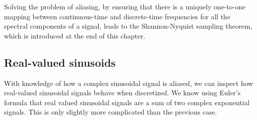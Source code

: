 Solving the problem of aliasing, by ensuring that there is a uniquely one-to-one mapping 
between continuous-time and discrete-time frequencies for all the spectral components 
of a signal, leads to the Shannon-Nyquist sampling theorem, which is introduced at the end of this chapter.

\subsection{Real-valued sinusoids}

With knowledge of how a complex sinusoidal signal is aliased, we can
inspect how real-valued sinusoidal signals behave when discretized. We
know using Euler's formula that real valued sinusoidal signals are a
sum of two complex exponential signals. This is only slightly more
complicated than the previous case.

